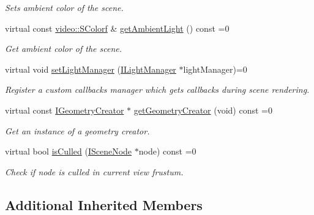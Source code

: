 \begin{DoxyCompactItemize}
\begin{DoxyCompactList}\small\item\em Sets ambient color of the scene. \end{DoxyCompactList}\item 
virtual const \hyperlink{classirr_1_1video_1_1SColorf}{video\+::\+S\+Colorf} \& \hyperlink{classirr_1_1scene_1_1ISceneManager_adec06ba0cc248383153af9bc044cbd34}{get\+Ambient\+Light} () const  =0\hypertarget{classirr_1_1scene_1_1ISceneManager_adec06ba0cc248383153af9bc044cbd34}{}\label{classirr_1_1scene_1_1ISceneManager_adec06ba0cc248383153af9bc044cbd34}

\begin{DoxyCompactList}\small\item\em Get ambient color of the scene. \end{DoxyCompactList}\item 
virtual void \hyperlink{classirr_1_1scene_1_1ISceneManager_a0065307bf3ff12fdc5b7bb624987a1c2}{set\+Light\+Manager} (\hyperlink{classirr_1_1scene_1_1ILightManager}{I\+Light\+Manager} $\ast$light\+Manager)=0
\begin{DoxyCompactList}\small\item\em Register a custom callbacks manager which gets callbacks during scene rendering. \end{DoxyCompactList}\item 
virtual const \hyperlink{classirr_1_1scene_1_1IGeometryCreator}{I\+Geometry\+Creator} $\ast$ \hyperlink{classirr_1_1scene_1_1ISceneManager_aa907bfdd82887a9855157fdfb41985e0}{get\+Geometry\+Creator} (void) const  =0
\begin{DoxyCompactList}\small\item\em Get an instance of a geometry creator. \end{DoxyCompactList}\item 
virtual bool \hyperlink{classirr_1_1scene_1_1ISceneManager_a819bea16578056eea049d4bfe0545575}{is\+Culled} (\hyperlink{classirr_1_1scene_1_1ISceneNode}{I\+Scene\+Node} $\ast$node) const  =0
\begin{DoxyCompactList}\small\item\em Check if node is culled in current view frustum. \end{DoxyCompactList}\end{DoxyCompactItemize}
\subsection*{Additional Inherited Members}


